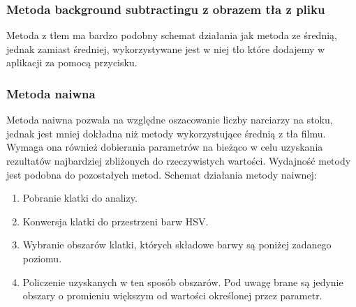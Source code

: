 \documentclass[a4paper]{article}
\begin{document}
\subsubsection{Metoda background subtractingu z obrazem tła z pliku}
Metoda z tłem ma bardzo podobny schemat działania jak metoda ze średnią, jednak zamiast średniej, wykorzystywane jest w niej tło które dodajemy w aplikacji za pomocą przycisku.

\subsubsection{Metoda naiwna}
Metoda naiwna pozwala na względne oszacowanie liczby narciarzy na stoku, jednak jest mniej dokładna niż metody wykorzystujące średnią z tła filmu. Wymaga ona również dobierania parametrów na bieżąco w celu uzyskania rezultatów najbardziej zbliżonych do rzeczywistych wartości. Wydajność metody jest podobna do pozostałych metod. Schemat działania metody naiwnej:
\begin{enumerate}
\item Pobranie klatki do analizy.
\item Konwersja klatki do przestrzeni barw HSV.
\item Wybranie obszarów klatki, których składowe barwy są poniżej zadanego poziomu.
\item Policzenie uzyskanych w ten sposób obszarów. Pod uwagę brane są jedynie obszary o promieniu większym od wartości określonej przez parametr.
\end{enumerate}
\end{document}

